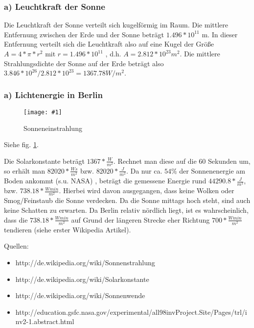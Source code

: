 \documentclass[a4paper,headings=small]{scrartcl}
\numberwithin{equation}{section} %
\numberwithin{figure}{section}   %
\newcommand{\image}[3]{
	\begin{figure}[htbp]
		\centering
		\texttt{[image: \#1]}
		\caption{#3}
		\label{fig:#1}
	\end{figure}
}
\begin{document}
\subsubsection*{a) Leuchtkraft der Sonne}

Die Leuchtkraft der Sonne verteilt sich kugelförmig im Raum.
Die mittlere Entfernung zwischen der Erde und der Sonne beträgt $1.496 * 10^{11}$ m.
In dieser Entfernung verteilt sich die Leuchtkraft also auf eine Kugel der Größe $A = 4 * \pi * r^{2}$ mit $r = 1.496 * 10^{11}$ , d.h. $A = 2.812 * 10^{23} m^{2}$.
Die mittlere Strahlungsdichte der Sonne auf der Erde beträgt also $3.846 * 10^{26} / 2.812 * 10^{23} = 1367.78 W / m^{2}$.

\subsubsection*{a) Lichtenergie in Berlin}

\image{img/sonneneinstrahlung2}{0.8}{Sonneneinstrahlung}

Siehe fig. \ref{fig:img/sonneneinstrahlung2}.

Die Solarkonstante beträgt $1367 * \frac{W}{m^2}$. Rechnet man diese auf die 60 Sekunden um, so erhält man $82020 * \frac{W s}{m^2}$ bzw. $82020 * \frac{J}{m^2}$.
Da nur ca. $54\%$ der Sonnenenergie am Boden ankommt (s.u. NASA) , beträgt die gemessene Energie rund $44290.8 * \frac{J}{m^2}$, bzw. $738.18 * \frac{W min}{m^2}$.
Hierbei wird davon ausgegangen, dass keine Wolken oder Smog/Feinstaub die Sonne verdecken. Da die Sonne mittags hoch steht, sind auch keine Schatten zu erwarten.
Da Berlin relativ nördlich liegt, ist es wahrscheinlich, dass die $738.18 * \frac{W min}{m^2}$ auf Grund der längeren Strecke eher Richtung $700 * \frac{W min}{m^2}$ tendieren (siehe erster Wikipedia Artikel).

Quellen:
\begin{itemize}
\item http://de.wikipedia.org/wiki/Sonnenstrahlung
\item http://de.wikipedia.org/wiki/Solarkonstante
\item http://de.wikipedia.org/wiki/Sonnenwende
\item http://education.gsfc.nasa.gov/experimental/all98invProject.Site/Pages/trl/inv2-1.abstract.html
\end{itemize}
\end{document}
